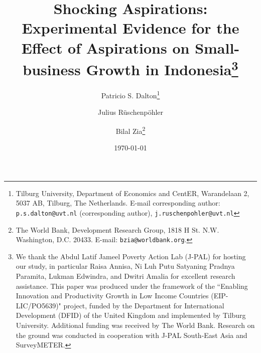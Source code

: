 \documentclass[11.5pt]{article}
\begin{document}
\title{\Large \textbf{Shocking Aspirations: \\Experimental Evidence for the Effect of Aspirations on Small-business Growth in Indonesia}\thanks {\scriptsize We thank the Abdul Latif Jameel Poverty Action Lab (J-PAL) for hosting our study, in particular Raisa Annisa, Ni Luh Putu Satyaning Pradnya Paramita, Lukman Edwindra, and Dwitri Amalia for excellent research assistance. This paper was produced under the framework of the \textquotedblleft Enabling Innovation and Productivity Growth in Low Income Countries (EIP-LIC/PO5639)" project, funded by the Department for International Development (DFID) of the United Kingdom and implemented by Tilburg University. Additional funding was received by The World Bank. Research on the ground was conducted in cooperation with J-PAL South-East Asia and SurveyMETER.}}

\author{Patricio S. Dalton\thanks{\scriptsize Tilburg University, Department of Economics and CentER, Warandelaan 2, 5037 AB, Tilburg, The Netherlands. E-mail corresponding author: \texttt{p.s.dalton@uvt.nl} (corresponding author), \texttt{j.ruschenpohler@uvt.nl}}
\and Julius R\"uschenp\"ohler\footnotemark[2]
\and Bilal Zia\thanks{\scriptsize The World Bank, Development Research Group, 1818 H St. N.W. Washington, D.C. 20433. E-mail: \texttt{bzia@worldbank.org}.}}


\date{\today}
\maketitle
\singlespace
\end{document}

